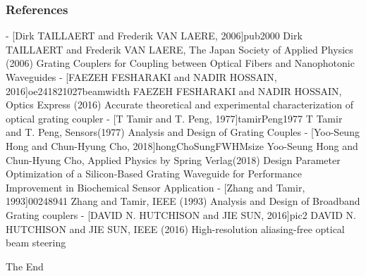 \documentclass{beamer}
\begin{document}
\begin{frame}
\frametitle{References}
\footnotesize{
\begin{thebibliography}{99} %
- [Dirk TAILLAERT and Frederik VAN LAERE, 2006]{pub2000} Dirk TAILLAERT and Frederik VAN LAERE, The Japan Society of Applied Physics (2006)
\newblock Grating Couplers for Coupling between Optical Fibers and Nanophotonic Waveguides
%
- [FAEZEH FESHARAKI and NADIR HOSSAIN, 2016]{oe241821027beamwidth} FAEZEH FESHARAKI and NADIR HOSSAIN, Optics Express (2016)
\newblock Accurate theoretical and experimental characterization of optical grating coupler
%
- [T Tamir and T. Peng, 1977]{tamirPeng1977} T Tamir and T. Peng,  Sensors(1977)
\newblock Analysis and Design of Grating Couples
%
- [Yoo-Seung Hong and Chun-Hyung Cho, 2018]{hongChoSungFWHMsize} Yoo-Seung Hong and Chun-Hyung Cho,  Applied Physics by Spring Verlag(2018)
\newblock Design Parameter Optimization of a Silicon-Based Grating Waveguide for Performance Improvement in Biochemical Sensor Application
%
- [Zhang and Tamir, 1993]{00248941} Zhang and Tamir,  IEEE (1993)
\newblock Analysis and Design of Broadband Grating couplers
%
- [DAVID N. HUTCHISON and JIE SUN, 2016]{pic2} DAVID N. HUTCHISON and JIE SUN,  IEEE (2016)
\newblock High-resolution aliasing-free optical beam steering
%
\end{thebibliography}
}
\end{frame}


\begin{frame}
\Huge{\centerline{The End}}
\end{frame}

\end{document}
